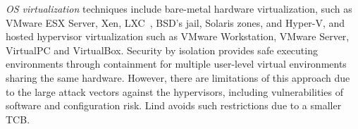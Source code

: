 \textit{OS virtualization}
techniques include
bare-metal hardware virtualization, such as VMware ESX Server, Xen,
LXC~\cite{LXC}, BSD's jail, Solaris zones, and Hyper-V, and
hosted hypervisor virtualization such as VMware
Workstation, VMware Server, VirtualPC and VirtualBox.
%
Security by isolation \cite{Qubes, Overshadow, SecureVM, HypSec}
provides safe executing environments through containment for multiple
user-level virtual environments sharing the same hardware.
However, there are limitations of this approach due to
the large attack vectors against the hypervisors, including
vulnerabilities of software and configuration risk. Lind avoids such restrictions due to a smaller TCB.

